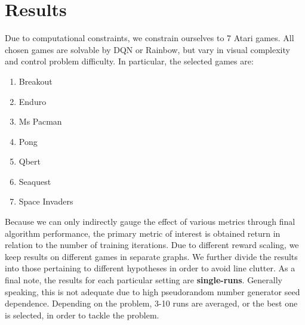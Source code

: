 \chapter{Results}
Due to computational constraints, we constrain ourselves to 7 Atari games.
All chosen games are solvable by DQN or Rainbow, but vary in visual complexity
and control problem difficulty.
In particular, the selected games are: 
\begin{enumerate}
		\item Breakout
		\item Enduro
		\item Ms Pacman
		\item Pong
		\item Qbert
		\item Seaquest
		\item Space Invaders
\end{enumerate}

Because we can only indirectly gauge the effect of various metrics through 
final algorithm performance, the primary metric of interest is obtained 
return in relation to the number of training iterations.
Due to different reward scaling, we keep results on different games in separate graphs.
We further divide the results into those pertaining to different hypotheses
in order to avoid line clutter.
As a final note, the results for each particular setting are \textbf{single-runs}.
Generally speaking, this is not adequate due to high pseudorandom number generator seed 
dependence. Depending on the problem, 3-10 runs are averaged, or the best one is selected,
in order to tackle the problem.

